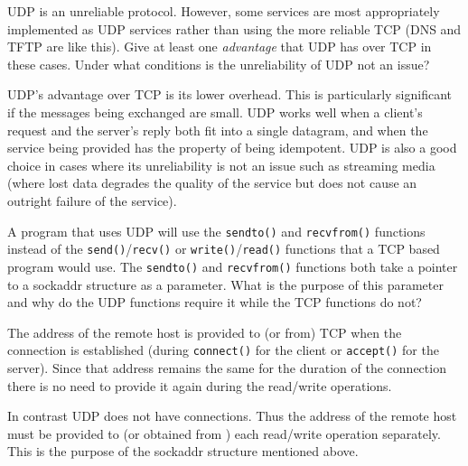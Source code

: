 \documentclass[12pt]{examdesign}
\begin{document}
\begin{shortanswer}

  \begin{question}
    UDP is an unreliable protocol. However, some services are most appropriately implemented as
    UDP services rather than using the more reliable TCP (DNS and TFTP are like this). Give at
    least one \emph{advantage} that UDP has over TCP in these cases. Under what conditions is
    the unreliability of UDP not an issue?

    \begin{answer}
      UDP's advantage over TCP is its lower overhead. This is particularly significant if the
      messages being exchanged are small. UDP works well when a client's request and the
      server's reply both fit into a single datagram, and when the service being provided has
      the property of being idempotent. UDP is also a good choice in cases where its
      unreliability is not an issue such as streaming media (where lost data degrades the
      quality of the service but does not cause an outright failure of the service).
    \end{answer}
  \end{question}


  \begin{question}
    A program that uses UDP will use the \texttt{sendto()} and \texttt{recvfrom()} functions
    instead of the \texttt{send()}/\texttt{recv()} or \texttt{write()}/\texttt{read()} functions
    that a TCP based program would use. The \texttt{sendto()} and \texttt{recvfrom()} functions
    both take a pointer to a sockaddr structure as a parameter. What is the purpose of this
    parameter and why do the UDP functions require it while the TCP functions do not?

    \begin{answer}
      The address of the remote host is provided to (or from) TCP when the connection is
      established (during \texttt{connect()} for the client or \texttt{accept()} for the
      server). Since that address remains the same for the duration of the connection there is
      no need to provide it again during the read/write operations.

      In contrast UDP does not have connections. Thus the address of the remote host must be
      provided to (or obtained from ) each read/write operation separately. This is the purpose
      of the sockaddr structure mentioned above.
    \end{answer}
  \end{question}


\end{shortanswer}
\end{document}
